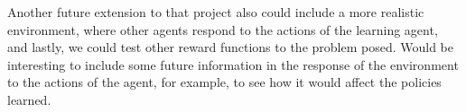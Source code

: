 \documentclass[a4paper]{article}
\begin{document}
Another future extension to that project also could include a more realistic environment, where other agents respond to the actions of the learning agent, and lastly, we could test other reward functions to the problem posed. Would be interesting to include some future information in the response of the environment to the actions of the agent, for example, to see how it would affect the policies learned.




\end{document}
